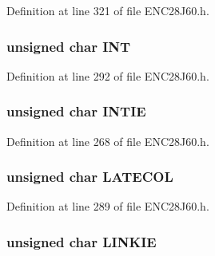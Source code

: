 Definition at line 321 of file E\+N\+C28\+J60.\+h.

\hypertarget{union___r_e_g_a90e8b4ab91a5d70fec2a81ed0284593f}{}
\subsubsection[{I\+N\+T}]{\setlength{\rightskip}{0pt plus 5cm}unsigned {\bf char} {\bf I\+N\+T}}\label{union___r_e_g_a90e8b4ab91a5d70fec2a81ed0284593f}


Definition at line 292 of file E\+N\+C28\+J60.\+h.

\hypertarget{union___r_e_g_a45d1c2f88674913abceb675882362d3e}{}
\subsubsection[{I\+N\+T\+I\+E}]{\setlength{\rightskip}{0pt plus 5cm}unsigned {\bf char} I\+N\+T\+I\+E}\label{union___r_e_g_a45d1c2f88674913abceb675882362d3e}


Definition at line 268 of file E\+N\+C28\+J60.\+h.

\hypertarget{union___r_e_g_a3b21b22f1010a92ae1d227208299246a}{}
\subsubsection[{L\+A\+T\+E\+C\+O\+L}]{\setlength{\rightskip}{0pt plus 5cm}unsigned {\bf char} L\+A\+T\+E\+C\+O\+L}\label{union___r_e_g_a3b21b22f1010a92ae1d227208299246a}


Definition at line 289 of file E\+N\+C28\+J60.\+h.

\hypertarget{union___r_e_g_a4cc25f0ba5bcb4ac6ff1bd68769b4c8f}{}
\subsubsection[{L\+I\+N\+K\+I\+E}]{\setlength{\rightskip}{0pt plus 5cm}unsigned {\bf char} L\+I\+N\+K\+I\+E}\label{union___r_e_g_a4cc25f0ba5bcb4ac6ff1bd68769b4c8f}


